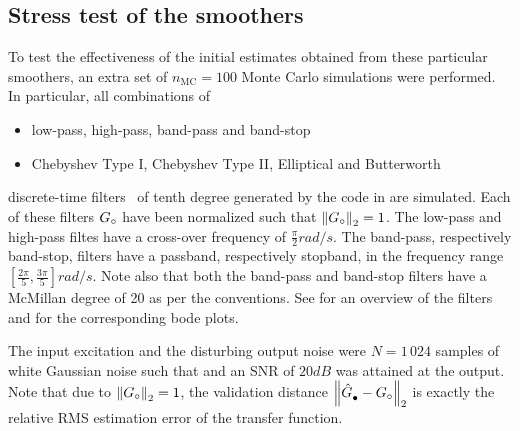 \subsection{Stress test of the smoothers}
To test the effectiveness of the initial estimates obtained from these particular smoothers, an extra set of $n_{\mathrm{MC}} = 100$ Monte Carlo simulations were performed.
In particular, all combinations of
\begin{itemize}
  \item low-pass, high-pass, band-pass and band-stop 
  \item Chebyshev Type I, Chebyshev Type II, Elliptical and Butterworth
\end{itemize}
discrete-time filters~\citep{Zverev1967} of tenth degree generated by the \MATLAB code in  are simulated.
Each of these filters $\true{G}$ have been normalized such that $\norm[2]{\true{G}} = 1$.
The low-pass and high-pass filtes have a cross-over frequency of $\frac{\pi}{2} \unit{rad/s}$. 
The band-pass, respectively band-stop, filters have a passband, respectively stopband, in the frequency range$\left[ \frac{2\pi}{5}, \frac{3\pi}{5}\right] \unit{rad/s}$.
Note also that both the band-pass and band-stop filters have a McMillan degree of 20 as per the \MATLAB conventions.
See  for an overview of the filters and   for the corresponding bode plots.





The input excitation and the disturbing output noise were $N=1\,024$ samples of white Gaussian noise such that and an \gls{SNR} of $20 \unit{dB}$ was attained at the output.
Note that due to $\norm[2]{\true{G}}=1$, the validation distance $\norm[2]{\model{\bullet} - \true{G}}$ is exactly the relative \gls{RMS} estimation error of the transfer function.

